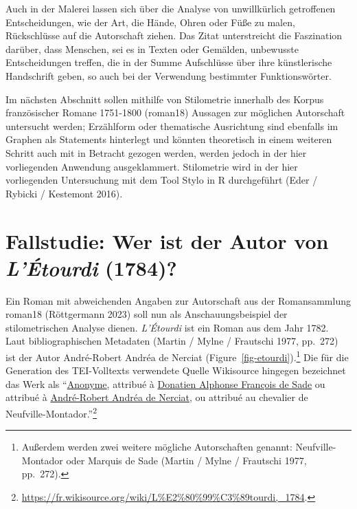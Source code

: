 \documentclass[
  12pt,
  letterpaper,
]{classicthesis}
\begin{document}
Auch in der Malerei lassen sich über die Analyse von unwillkürlich
getroffenen Entscheidungen, wie der Art, die Hände, Ohren oder Füße zu
malen, Rückschlüsse auf die Autorschaft ziehen. Das Zitat unterstreicht
die Faszination darüber, dass Menschen, sei es in Texten oder Gemälden,
unbewusste Entscheidungen treffen, die in der Summe Aufschlüsse über
ihre künstlerische Handschrift geben, so auch bei der Verwendung
bestimmter Funktionswörter.

Im nächsten Abschnitt sollen mithilfe von Stilometrie innerhalb des
Korpus französischer Romane 1751-1800 (roman18) Aussagen zur möglichen
Autorschaft untersucht werden; Erzählform oder thematische Ausrichtung
sind ebenfalls im Graphen als Statements hinterlegt und könnten
theoretisch in einem weiteren Schritt auch mit in Betracht gezogen
werden, werden jedoch in der hier vorliegenden Anwendung ausgeklammert.
Stilometrie wird in der hier vorliegenden Untersuchung mit dem Tool
Stylo in R durchgeführt (Eder / Rybicki / Kestemont 2016).

\section{\texorpdfstring{Fallstudie: Wer ist der Autor von
\emph{L'Étourdi}
(1784)?}{Fallstudie: Wer ist der Autor von L'Étourdi (1784)?}}\label{fallstudie-wer-ist-der-autor-von-luxe9tourdi-1784}

Ein Roman mit abweichenden Angaben zur Autorschaft aus der Romansammlung
roman18 (Röttgermann 2023) soll nun als Anschauungsbeispiel der
stilometrischen Analyse dienen. \emph{L'Étourdi} ist ein Roman aus dem
Jahr 1782. Laut bibliographischen Metadaten (Martin / Mylne / Frautschi
1977, pp.~272) ist der Autor André-Robert Andréa de Nerciat
(Figure~\ref{fig-etourdi}).\footnote{Außerdem werden zwei weitere
  mögliche Autorschaften genannt: Neufville-Montador oder Marquis de
  Sade (Martin / Mylne / Frautschi 1977, pp.~272).} Die für die
Generation des TEI-Volltexts verwendete Quelle Wikisource hingegen
bezeichnet das Werk als
``\href{https://fr.wikisource.org/wiki/Auteur:Anonyme}{Anonyme},
attribué à
\href{https://fr.wikisource.org/wiki/Auteur:Donatien_Alphonse_Fran\%C3\%A7ois_de_Sade}{Donatien
Alphonse François de Sade} ou attribué à
\href{https://fr.wikisource.org/wiki/Auteur:Andr\%C3\%A9-Robert_Andr\%C3\%A9a_de_Nerciat}{André-Robert
Andréa de Nerciat}, ou attribué au chevalier de
Neufville-Montador.''\footnote{\url{https://fr.wikisource.org/wiki/L\%E2\%80\%99\%C3\%89tourdi,_1784}.}
\end{document}
